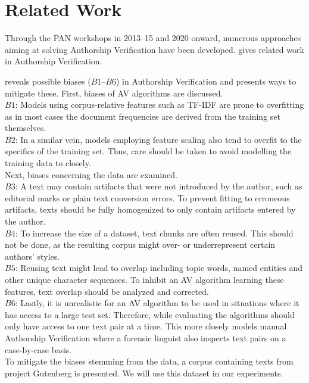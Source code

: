 \chapter{Related Work}\label{related_work}
Through the PAN workshops in 2013--15 and 2020 onward, numerous approaches aiming at solving Authorship Verification have been developed.
\cite{stein2019unbiasedGutenbergCorpus} gives related work in Authorship Verification.

\cite{stein2019unbiasedGutenbergCorpus} reveals possible biases ($B1$--$B6$) in Authorship Verification and presents ways to mitigate these.
First, biases of AV algorithms are discussed.\\
$B1$: Models using corpus-relative features such as TF-IDF are prone to overfitting as in most cases the document frequencies are derived from the training set themselves.\\
$B2$: In a similar vein, models employing feature scaling also tend to overfit to the specifics of the training set.
Thus, care should be taken to avoid modelling the training data to closely.\\
Next, biases concerning the data are examined.\\
$B3$: A text may contain artifacts that were not introduced by the author, such as editorial marks or plain text conversion errors.
To prevent fitting to erroneous artifacts, texts should be fully homogenized to only contain artifacts entered by the author.\\
$B4$: To increase the size of a dataset, text chunks are often reused.
This should not be done, as the resulting corpus might over- or underrepresent certain authors' styles.\\
$B5$: Reusing text might lead to overlap including topic words, named entities and other unique character sequences.
To inhibit an AV algorithm learning these features, text overlap should be analyzed and corrected.\\
$B6$: Lastly, it is unrealistic for an AV algorithm to be used in situations where it has access to a large test set.
Therefore, while evaluating the algorithms should only have access to one text pair at a time.
This more closely models manual Authorship Verification where a forensic linguist also inspects text pairs on a case-by-case basis.\\
To mitigate the biases stemming from the data, a corpus containing texts from project Gutenberg is presented.
We will use this dataset in our experiments.


